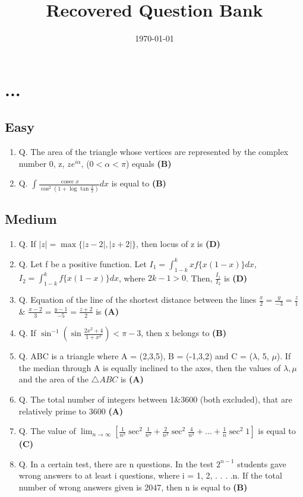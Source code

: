 \documentclass{article}
\begin{document}
 
\title{\textbf{Recovered Question Bank}}
\date{\today}
\maketitle
\section{...}
\subsection{Easy}
\begin{enumerate}
\item Q. The area of the triangle whose vertices are represented by the complex number 0, z, $ze^{i\alpha}$, ($0 < \alpha < \pi$) equals \hfill \textbf{(B)}
\item Q. $\int \frac{\operatorname{cosec} x}{\cos^2 \left(1+\log \tan \frac{x}{2}\right)}dx$ is equal to \hfill \textbf{(B)}
\end{enumerate}
\subsection{Medium}
\begin{enumerate}
\item Q. If $|z| = \max\{|z - 2|, |z + 2|\}$, then locus of z is \hfill \textbf{(D)}
\item Q. Let f be a positive function. Let $I_1 = \int_{1-k}^k x f \{x(1-x)\}dx$, $I_2 = \int_{1-k}^k f\{x(1-x)\}dx$, where $2k - 1 > 0$. Then, $\frac{I_1}{I_2}$ is \hfill \textbf{(D)}
\item Q. Equation of the line of the shortest distance between the lines $\frac{x}{2} = \frac{y}{-3} = \frac{z}{1}$ & $\frac{x-2}{3} = \frac{y-1}{-5} = \frac{z+2}{2}$ is \hfill \textbf{(A)}
\item Q. If $\sin^{-1}\left(\sin \frac{2x^2+4}{1+x^2}\right) < \pi-3$, then x belongs to \hfill \textbf{(B)}
\item Q. ABC is a triangle where A = (2,3,5), B = (-1,3,2) and C = ($\lambda$, 5, $\mu$). If the median through A is equally inclined to the axes, then the values of $\lambda, \mu$ and the area of the $\triangle ABC$ is \hfill \textbf{(A)}
\item Q. The total number of integers between 1&3600 (both excluded), that are relatively prime to 3600 \hfill \textbf{(A)}
\item Q. The value of $\lim_{n\to\infty} \left[\frac{1}{n^2} \sec^2 \frac{1}{n^2} + \frac{2}{n^2} \sec^2 \frac{4}{n^2} + \dots + \frac{1}{n} \sec^2 1\right]$ is equal to \hfill \textbf{(C)}
\item Q. In a certain test, there are n questions. In the test $2^{n-1}$ students gave wrong answers to at least i questions, where i = 1, 2, . . . .n. If the total number of wrong answers given is 2047, then n is equal to \hfill \textbf{(B)}
\end{enumerate}
\end{document}
